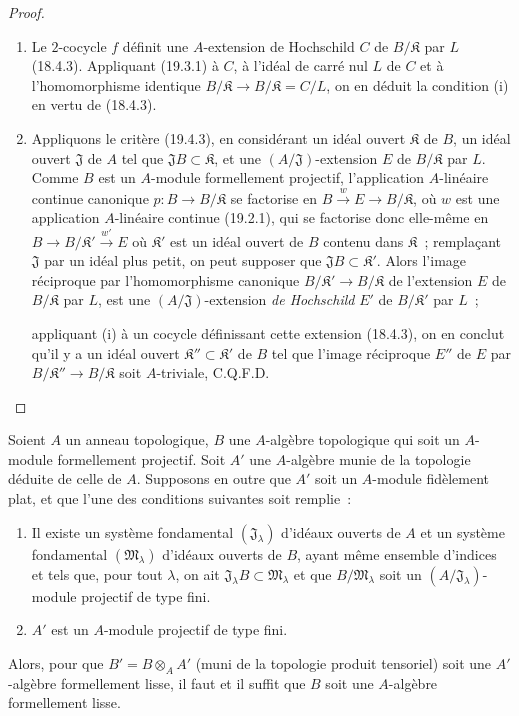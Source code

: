 \begin{proof}
\begin{enumerate}
  \item[(i)] Le $2$-cocycle $f$ définit une $A$-extension de Hochschild $C$
  de $B/\mathfrak K$ par $L$ (18.4.3). Appliquant (19.3.1) à $C$, à l'idéal
  de carré nul $L$ de $C$ et à l'homomorphisme identique
  $B/\mathfrak K\to B/\mathfrak K=C/L$, on en déduit la condition (i) en
  vertu de (18.4.3).
  \item[(ii)] Appliquons le critère (19.4.3), en considérant un idéal ouvert
  $\mathfrak K$ de $B$, un idéal ouvert $\mathfrak J$ de $A$ tel que
  $\mathfrak JB\subset\mathfrak K$, et une $(A/\mathfrak J)$-extension $E$
  de $B/\mathfrak K$ par $L$. Comme $B$ est un $A$-module formellement
  projectif, l'application $A$-linéaire continue canonique
  $p:B\to B/\mathfrak K$ se factorise en
  $B\xrightarrow{w}E\to B/\mathfrak K$, où $w$ est une application
  $A$-linéaire continue (19.2.1), qui se factorise donc elle-même en
  $B\to B/\mathfrak K'\xrightarrow{w'}E$ où $\mathfrak K'$ est un idéal
  ouvert de $B$ contenu dans $\mathfrak K$~; remplaçant $\mathfrak J$ par
  un idéal plus petit, on peut supposer que
  $\mathfrak JB\subset\mathfrak K'$. Alors l'image réciproque par
  l'homomorphisme canonique $B/\mathfrak K'\to B/\mathfrak K$ de
  l'extension $E$ de $B/\mathfrak K$ par $L$, est une
  $(A/\mathfrak J)$-extension \emph{de Hochschild} $E'$ de
  $B/\mathfrak K'$ par $L$~;


  appliquant (i) à un cocycle définissant cette extension (18.4.3), on en
  conclut qu'il y a un idéal ouvert
  $\mathfrak K''\subset\mathfrak K'$ de $B$ tel que l'image réciproque
  $E''$ de $E$ par $B/\mathfrak K''\to B/\mathfrak K$ soit
  $A$-triviale, C.Q.F.D.
\end{enumerate}
\end{proof}

\begin{corollary}[19.4.6]
\label{0.19.4.6-fr}
Soient $A$ un anneau topologique, $B$ une $A$-algèbre topologique qui soit un
$A$-module formellement projectif. Soit $A'$ une $A$-algèbre munie de
la topologie déduite de celle de $A$. Supposons en outre que $A'$ soit un
$A$-module fidèlement plat, et que l'une des conditions suivantes soit
remplie~:
\begin{enumerate}
  \item[$1^\circ$] Il existe un système fondamental
  $(\mathfrak J_\lambda)$ d'idéaux ouverts de $A$ et un système fondamental
  $(\mathfrak M_\lambda)$ d'idéaux ouverts de $B$, ayant même ensemble
  d'indices et tels que, pour tout $\lambda$, on ait
  $\mathfrak J_\lambda B\subset\mathfrak M_\lambda$ et que
  $B/\mathfrak M_\lambda$ soit un
  $(A/\mathfrak J_\lambda)$-module projectif de type fini.
  \item[$2^\circ$] $A'$ est un $A$-module projectif de type fini.
\end{enumerate}

Alors, pour que $B'=B\otimes_A A'$ (muni de la topologie produit tensoriel)
soit une $A'$-algèbre formellement lisse, il faut et il suffit que $B$ soit une
$A$-algèbre formellement lisse.
\end{corollary}

